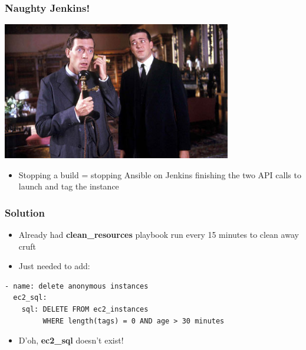 \documentclass{beamer}
\begin{document}
\begin{frame}\frametitle{Naughty Jenkins!}

    \begin{center}
        \includegraphics[width=10cm]{jeeves}
    \end{center}

    \begin{itemize}
        \item Stopping a build = stopping Ansible on Jenkins finishing the two API calls to launch and tag the instance
    \end{itemize}

\end{frame}


\begin{frame}[fragile]\frametitle{Solution}

    \begin{itemize}
        \item Already had \textbf{clean\_resources} playbook run every 15 minutes to clean away cruft
        \item Just needed to add:
    \end{itemize}

    \begin{lstlisting}
- name: delete anonymous instances
  ec2_sql:
    sql: DELETE FROM ec2_instances
         WHERE length(tags) = 0 AND age > 30 minutes
    \end{lstlisting}

    \begin{itemize}
        \item D'oh, \textbf{ec2\_sql} doesn't exist!
    \end{itemize}

\end{frame}
\end{document}
